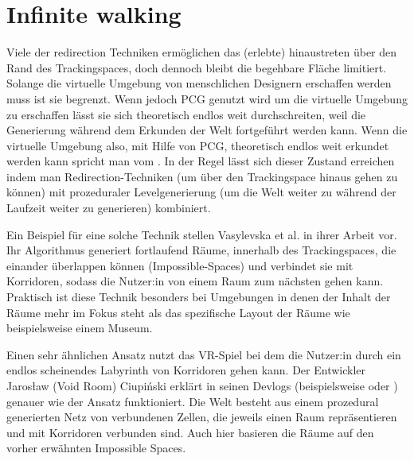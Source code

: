 \section{Infinite walking}
Viele der redirection Techniken ermöglichen das (erlebte) hinaustreten über den Rand des Trackingspaces, doch dennoch bleibt die begehbare Fläche limitiert. Solange die virtuelle Umgebung von menschlichen Designern erschaffen werden muss ist sie begrenzt. Wenn jedoch PCG genutzt wird um die virtuelle Umgebung zu erschaffen lässt sie sich theoretisch endlos weit durchschreiten, weil die Generierung während dem Erkunden der Welt fortgeführt werden kann.
Wenn die virtuelle Umgebung also, mit Hilfe von PCG, theoretisch endlos weit erkundet werden kann spricht man vom .
In der Regel lässt sich dieser Zustand %
erreichen indem man Redirection-Techniken (um über den Trackingspace hinaus gehen zu können) mit prozeduraler Levelgenerierung (um die Welt weiter zu während der Laufzeit weiter zu generieren) kombiniert.

Ein Beispiel für eine solche Technik stellen Vasylevska et al. in ihrer Arbeit \cite{flexible-spaces} vor. Ihr Algorithmus generiert fortlaufend Räume, innerhalb des Trackingspaces, die einander überlappen können (Impossible-Spaces) und verbindet sie mit Korridoren, sodass die Nutzer:in von einem Raum zum nächsten gehen kann. Praktisch ist diese Technik besonders bei Umgebungen in denen der Inhalt der Räume mehr im Fokus steht als das spezifische Layout der Räume wie beispielsweise einem Museum.

Einen sehr ähnlichen Ansatz nutzt das VR-Spiel  \cite{tea-for-god} bei dem die Nutzer:in durch ein endlos scheinendes Labyrinth von Korridoren gehen kann. Der Entwickler Jarosław (Void Room) Ciupiński erklärt in seinen Devlogs (beispielsweise \cite{tea-for-god-devlog-a} oder \cite{tea-for-god-devlog-b}) genauer wie der Ansatz funktioniert.
Die Welt besteht aus einem prozedural generierten Netz von verbundenen Zellen, die jeweils einen Raum repräsentieren und mit Korridoren verbunden sind. Auch hier basieren die Räume auf den vorher erwähnten Impossible Spaces.

